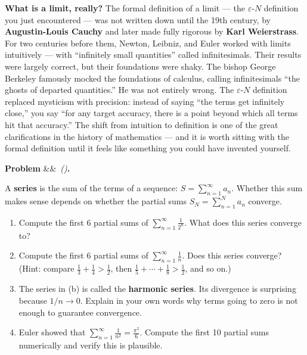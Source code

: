 \documentclass[12pt, a4paper]{article}
\newcounter{problem}
\newenvironment{problem}[1][]{%
  \refstepcounter{problem}%
  \par\vspace{6pt}%
  \noindent\textbf{\color{MidBlue}Problem \theproblem}%
  \ifx&#1&\else\ \textit{(#1)}\fi\textbf{.}\enskip
}{\par\vspace{4pt}}
\begin{document}
\begin{thought}
\textbf{What is a limit, really?}
The formal definition of a limit --- the $\varepsilon$-$N$ definition you just encountered --- was not written down until the 19th century, by \textbf{Augustin-Louis Cauchy} and later made fully rigorous by \textbf{Karl Weierstrass}. For two centuries before them, Newton, Leibniz, and Euler worked with limits intuitively --- with ``infinitely small quantities'' called infinitesimals. Their results were largely correct, but their foundations were shaky. The bishop George Berkeley famously mocked the foundations of calculus, calling infinitesimals ``the ghosts of departed quantities.'' He was not entirely wrong. The $\varepsilon$-$N$ definition replaced mysticism with precision: instead of saying ``the terms get infinitely close,'' you say ``for any target accuracy, there is a point beyond which all terms hit that accuracy.'' The shift from intuition to definition is one of the great clarifications in the history of mathematics --- and it is worth sitting with the formal definition until it feels like something you could have invented yourself.
\end{thought}

\begin{problem}
\label{prob:series_intro}
A \textbf{series} is the sum of the terms of a sequence: $S = \sum_{n=1}^{\infty} a_n$. Whether this sum makes sense depends on whether the partial sums $S_N = \sum_{n=1}^{N} a_n$ converge.
\begin{enumerate}[label=(\alph*), topsep=2pt]
  \item Compute the first 6 partial sums of $\displaystyle\sum_{n=1}^{\infty} \frac{1}{2^n}$. What does this series converge to?
  \item Compute the first 6 partial sums of $\displaystyle\sum_{n=1}^{\infty} \frac{1}{n}$. Does this series converge? (Hint: compare $\frac{1}{3}+\frac{1}{4} > \frac{1}{2}$, then $\frac{1}{5}+\cdots+\frac{1}{8} > \frac{1}{2}$, and so on.)
  \item The series in (b) is called the \textbf{harmonic series}. Its divergence is surprising because $1/n \to 0$. Explain in your own words why terms going to zero is not enough to guarantee convergence.
  \item Euler showed that $\displaystyle\sum_{n=1}^{\infty} \frac{1}{n^2} = \frac{\pi^2}{6}$. Compute the first 10 partial sums numerically and verify this is plausible.
\end{enumerate}
\end{problem}
\end{document}

